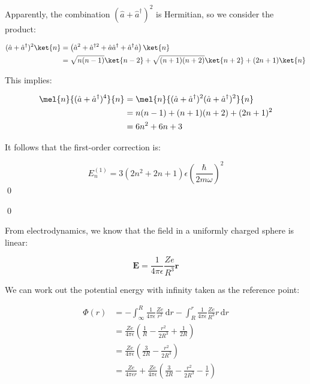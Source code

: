 \documentclass[12pt]{article}
\begin{document}
Apparently, the combination $(\hat{a} + \hat{a}^{\dagger})^{2}$ is Hermitian, so we consider the product:

\begin{equation}
    \begin{split}
        (\hat{a} + \hat{a}^{\dagger})^{2}\ket{n} &= \left( \hat{a}^{2} + \hat{a}^{\dagger 2} + \hat{a}\hat{a}^{\dagger} + \hat{a}^{\dagger}\hat{a} \right)\ket{n} \\
        &= \sqrt{n(n-1)} \ket{n-2} + \sqrt{(n+1)(n+2)} \ket{n+2} + (2n+1) \ket{n}
    \end{split}
\end{equation}

This implies:

\begin{equation}
    \begin{split}
        \mel{n}{(\hat{a} + \hat{a}^{\dagger})^{4}}{n} &= \mel{n}{(\hat{a} + \hat{a}^{\dagger})^{2}(\hat{a} + \hat{a}^{\dagger})^{2}}{n} \\
        &= n(n-1) + (n+1)(n+2) + (2n+1)^{2} \\
        &= 6n^{2} + 6n + 3
    \end{split}
\end{equation}

It follows that the first-order correction is:

\begin{equation}
    E_{n}^{(1)} = 3 (2n^{2} + 2n + 1) \epsilon \left( \frac{\hbar}{2m\omega} \right)^{2}
\end{equation}
\qed



\qed


From electrodynamics, we know that the field in a uniformly charged sphere is linear:

\begin{equation}
    \mathbf{E} = \frac{1}{4\pi\epsilon} \frac{Ze}{R^{3}} \mathbf{r}
\end{equation}

We can work out the potential energy with infinity taken as the reference point:

\begin{equation}
    \begin{split}
        \Phi(r) &= -\int_{\infty}^{R} \frac{1}{4\pi\epsilon} \frac{Ze}{r^{2}} \, \mathrm{d}r - \int_{R}^{r} \frac{1}{4\pi\epsilon} \frac{Ze}{R^{3}} r \, \mathrm{d}r \\
        &= \frac{Ze}{4\pi\epsilon} \left( \frac{1}{R} - \frac{r^{2}}{2R^{3}} + \frac{1}{2R} \right) \\
        &= \frac{Ze}{4\pi\epsilon} \left( \frac{3}{2R} - \frac{r^{2}}{2R^{3}} \right) \\
        &= \frac{Ze}{4\pi\epsilon r} + \frac{Ze}{4\pi\epsilon} \left( \frac{3}{2R} - \frac{r^{2}}{2R^{3}} - \frac{1}{r} \right)
    \end{split}
\end{equation}
\end{document}
